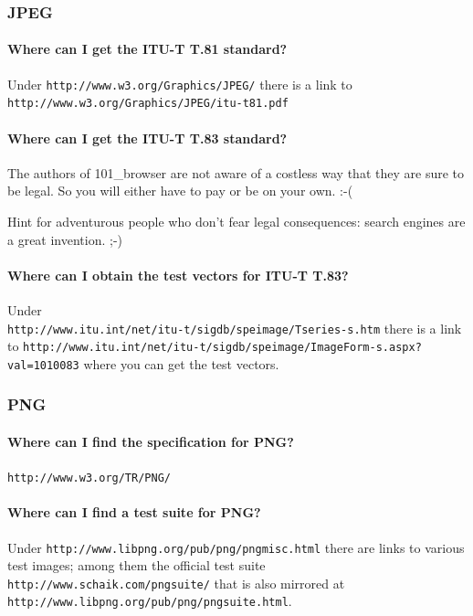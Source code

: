 \documentclass[10pt]{scrbook}
\begin{document}
\subsubsection{JPEG}

\paragraph{Where can I get the ITU-T T.81 standard?} Under \verb|http://www.w3.org/Graphics/JPEG/| there is a link to \verb|http://www.w3.org/Graphics/JPEG/itu-t81.pdf|

\paragraph{Where can I get the ITU-T T.83 standard?} The authors of 101\_browser are not aware of a costless way that they are sure to be legal. So you will either have to pay or be on your own. :-(

Hint for adventurous people who don't fear legal consequences: search engines are a great invention. ;-)

\paragraph{Where can I obtain the test vectors for ITU-T T.83?} Under \\
\verb|http://www.itu.int/net/itu-t/sigdb/speimage/Tseries-s.htm|
there is a link to
\verb|http://www.itu.int/net/itu-t/sigdb/speimage/ImageForm-s.aspx?val=1010083|
where you can get the test vectors.

\subsubsection{PNG}

\paragraph{Where can I find the specification for PNG?} \verb|http://www.w3.org/TR/PNG/|

\paragraph{Where can I find a test suite for PNG?}

Under \verb|http://www.libpng.org/pub/png/pngmisc.html| there are links to various test images; among them the official test suite \verb|http://www.schaik.com/pngsuite/| that is also mirrored at \verb|http://www.libpng.org/pub/png/pngsuite.html|.
\end{document}
